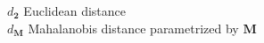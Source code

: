 \begin{tabbing}
$d_{\bm{2}}$ \> Euclidean distance \\
$d_{\bm{M}}$ \> Mahalanobis distance parametrized by $\bm{M}$ \\




\end{tabbing} 
